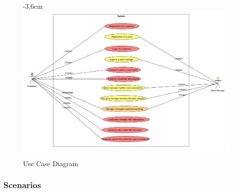 \documentclass{article}
\begin{document}
		\begin{figure}[!htb]
			\begin{adjustwidth} {-3,6cm}{}
				\centering
				\includegraphics[scale=0.42]{UC/1_useCaseDiagram.pdf}\\
				\caption{Use Case Diagram}
			\end{adjustwidth}
			
		\end{figure}
		
		\subsubsection{Scenarios}
			
\end{document}
